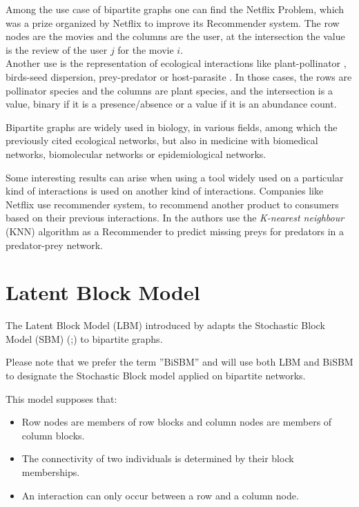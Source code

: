 \documentclass[12pt,a4paper]{report}
\begin{document}
Among the use case of bipartite graphs one can find the Netflix Problem, which
was a prize organized by Netflix to improve its Recommender system. The row 
nodes are the movies and the columns are the user, at the intersection the value
is the review of the user $j$ for the movie $i$.\\

Another use is the representation of ecological interactions like 
plant-pollinator \parencite{ramos-jilibertoTopologicalChangeAndean2010}, birds-seed
dispersion, prey-predator or
host-parasite \parencite{kaszewska-gilasGlobalStudiesHostParasite2021}.
In those cases, the rows are pollinator species and the columns are plant 
species, and the intersection is a value, binary if it is a presence/absence or
a value if it is an abundance count.

Bipartite graphs are widely used in biology, in various fields, among which the
previously cited ecological networks, but also in medicine with biomedical
networks, biomolecular networks or epidemiological 
networks. \parencite{pavlopoulosBipartiteGraphsSystems2018}


Some interesting results can arise when using a tool widely used on a particular
kind of interactions is used on another kind of interactions. Companies like
Netflix use recommender system, to recommend another product to consumers based
on their previous interactions.
In \cite{desjardins-proulxEcologicalInteractionsNetflix2017} the authors use the
\emph{K-nearest neighbour} (KNN) algorithm as a Recommender to predict missing
preys for predators in a predator-prey network.

\section{Latent Block Model}

The Latent Block Model (LBM) introduced by \cite{govaertLatentBlockModel2010} 
adapts the Stochastic Block Model (SBM) 
(\cite{hollandStochasticBlockmodelsFirst1983};\cite{snijdersEstimationPredictionStochastic1997})
to bipartite graphs.

\begin{small}
Please note that we prefer the term ''BiSBM'' and will use both LBM and BiSBM to
designate the Stochastic Block model applied on bipartite networks.
\end{small}

This model supposes that:
\begin{itemize}
    \item Row nodes are members of row blocks and column nodes are members of 
    column blocks.
    \item The connectivity of two individuals is determined by their block 
    memberships.
    \item An interaction can only occur between a row and a column node.
\end{itemize}
\end{document}
